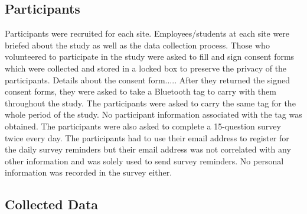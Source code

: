 \documentclass[acmtog]{acmart}
\begin{document}
\subsection{Participants}
Participants were recruited for each site. Employees/students at each site were briefed about the study as well as the data collection process. Those who volunteered to participate in the study were asked to fill and sign consent forms which were collected and stored in a locked box to preserve the privacy of the participants. Details about the consent form..... After they returned the signed consent forms, they were asked to take a Bluetooth tag to carry with them throughout the study. The participants were asked to carry the same tag for the whole period of the study. No participant information associated with the tag was obtained. The participants were also asked to complete a 15-question survey twice every day. The participants had to use their email address to register for the daily survey reminders but their email address was not correlated with any other information and was solely used to send survey reminders. No personal information was recorded in the survey either.

\subsection{Collected Data}
\end{document}
